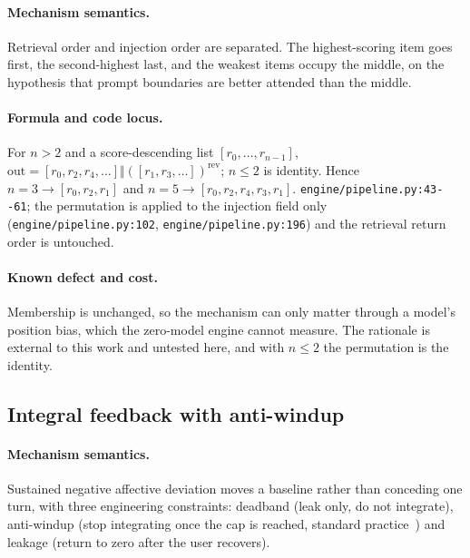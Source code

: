 \paragraph{Mechanism semantics.} Retrieval order and injection order are
separated. The highest-scoring item goes first, the second-highest last, and the
weakest items occupy the middle, on the hypothesis that prompt boundaries are
better attended than the middle.

\paragraph{Formula and code locus.} For $n>2$ and a score-descending list
$[r_0,\dots,r_{n-1}]$, $\mathrm{out} = [r_0,r_2,r_4,\dots] \Vert
([r_1,r_3,\dots])^{\mathrm{rev}}$; $n \le 2$ is identity. Hence
$n=3 \rightarrow [r_0,r_2,r_1]$ and $n=5 \rightarrow [r_0,r_2,r_4,r_3,r_1]$.
\texttt{engine/\allowbreak{}pipeline.\allowbreak{}py:\allowbreak{}43-\allowbreak{}-\allowbreak{}61}; the permutation is applied to the injection
field only (\texttt{engine/\allowbreak{}pipeline.\allowbreak{}py:\allowbreak{}102}, \texttt{engine/\allowbreak{}pipeline.\allowbreak{}py:\allowbreak{}196}) and
the retrieval return order is untouched.

\paragraph{Known defect and cost.} Membership is unchanged, so the mechanism can
only matter through a model's position bias, which the zero-model engine cannot
measure. The rationale is external to this work and untested here, and with
$n \le 2$ the permutation is the identity.

\subsection{Integral feedback with anti-windup}\label{sec:method:integral}

\paragraph{Mechanism semantics.} Sustained negative affective deviation moves a
baseline rather than conceding one turn, with three engineering constraints:
deadband (leak only, do not integrate), anti-windup (stop integrating once the
cap is reached, standard practice~\cite{astrom2006}) and leakage (return to
zero after the user recovers).


